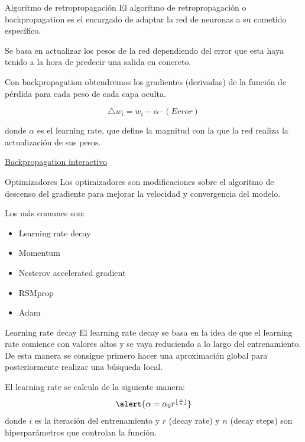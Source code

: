 \begin{frame}{Algoritmo de retropropagación}
El algoritmo de \alert{retropropagación} o \alert{backpropagation} es el encargado de \alert{adaptar} la red de neuronas a su cometido específico.

Se basa en actualizar los \alert{pesos} de la red dependiendo del \alert{error} que esta haya tenido a la hora de predecir una \alert{salida} en concreto.

Con backpropagation obtendremos los \alert{gradientes (derivadas)} de la función de pérdida
para cada \alert{peso} de cada \alert{capa oculta}.

\begin{equation}
    \bigtriangleup w_i = w_i - \alpha \cdot (Error)
\end{equation}

donde $\alpha$ es el \alert{learning rate}, que define la \alert{magnitud} con la que la red realiza la \alert{actualización} de sus pesos.

\href{https://xnought.github.io/backprop-explainer/}{Backpropagation interactivo}

\end{frame}

\begin{frame}{Optimizadores}
Los \alert{optimizadores} son \alert{modificaciones} sobre el algoritmo de descenso del gradiente para \alert{mejorar} la velocidad y convergencia del modelo.

Los más comunes son:
\begin{itemize}
    \item \alert{Learning rate decay}
    \item \alert{Momentum}
    \item \alert{Nesterov accelerated gradient}
    \item \alert{RSMprop}
    \item \alert{Adam}
\end{itemize}
\end{frame}

\begin{frame}{Learning rate decay}
El \alert{learning rate decay} se basa en la idea de que el \alert{learning rate} comience con valores altos y se vaya \alert{reduciendo} a lo largo del entrenamiento. De esta manera se consigue primero hacer una \alert{aproximación global} para posteriormente realizar una \alert{búsqueda local}.

El learning rate se calcula de la siguiente manera:
\begin{equation}
    \alert{\alpha = \alpha_0 r^{\lfloor \frac{i}{n} \rfloor}}
\end{equation}
donde \alert{$i$} es la \alert{iteración} del entrenamiento y \alert{$r$} (decay rate) y \alert{$n$} (decay steps) son hiperparámetros que controlan la función.
\end{frame}

